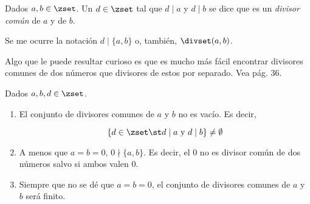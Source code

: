 




\begin{deffinition}
  Dados $a, b \in \zset$. Un $d \in \zset$ tal que $d \mid a$ y $d \mid b$
  se dice que es un \emph{divisor común} de $a$ y de $b$.
\end{deffinition}

Se me ocurre la notación $d \mid \{a, b\}$ o, también, $\divset(a, b)$.

Algo que le puede resultar curioso es que es mucho más fácil encontrar
divisores comunes de dos números que divisores de estos por separado. Vea
\cite{stillwell-elem-maths} pág. 36.

\begin{properties}
  Dados $a, b, d \in \zset$.

  \begin{enumerate}
    \item El conjunto de divisores comunes de $a$ y $b$ no es vacío. Es
      decir,

      $$ \left\{d \in \zset \st d \mid a \ \text{y} \ d \mid b\right\} \neq
      \emptyset $$

    \item A menos que $a = b = 0$, $0 \nmid \{a, b\}$. Es decir, el 0 no es
      divisor común de dos números salvo si ambos valen 0.

    \item Siempre que no se dé que $a = b = 0$, el conjunto de divisores
      comunes de $a$ y $b$ será finito.
  \end{enumerate}
\end{properties}

